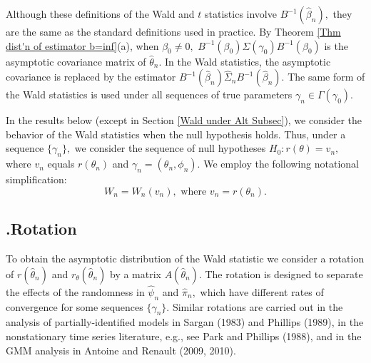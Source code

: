 \documentclass[12pt,thmsb,titlepage,final,oneside,letterpaper]{article}
\begin{document}
\noindent Although these definitions of the Wald and $t$ statistics involve $%
B^{-1}(\widehat{\beta }_{n}),$ they are the same as the standard definitions
used in practice. By Theorem \ref{Thm dist'n of estimator b=inf}(a), when $%
\beta _{0}\neq 0,$ $B^{-1}(\beta _{0})\Sigma (\gamma _{0})B^{-1}(\beta _{0})$
is the asymptotic covariance matrix of $\widehat{\theta }_{n}.$ In the Wald
statistics, the asymptotic covariance is replaced by the estimator $B^{-1}(%
\widehat{\beta }_{n})\widehat{\Sigma }_{n}B^{-1}(\widehat{\beta }_{n}).$ The
same form of the Wald statistics is used under all sequences of true
parameters $\gamma _{n}\in \Gamma (\gamma _{0}).$

In the results below (except in Section \ref{Wald under Alt Subsec}), we
consider the behavior of the Wald statistics when the null hypothesis holds.
Thus, under a sequence $\{\gamma _{n}\},$ we consider the sequence of null
hypotheses $H_{0}:r(\theta )=v_{n},$ where $v_{n}$ equals $r(\theta _{n})$
and $\gamma _{n}=(\theta _{n},\phi _{n}).$ We employ the following
notational simplification:%
\begin{equation}
W_{n}=W_{n}(v_{n}),\text{ where }v_{n}=r(\theta _{n}).
\label{Null Defn of Wald and t Stats}
\end{equation}

\subsection{\hspace{-0.23in}\textbf{.}\hspace{0.18in}Rotation}

\hspace{0.25in}To obtain the asymptotic distribution of the Wald statistic
we consider a rotation of $r(\widehat{\theta }_{n})$ and $r_{\theta }(%
\widehat{\theta }_{n})$ by a matrix $A(\widehat{\theta }_{n}).$ The rotation
is designed to separate the effects of the randomness in $\widehat{\psi }%
_{n} $ and $\widehat{\pi }_{n},$ which have different rates of convergence
for some sequences $\{\gamma _{n}\}.$ Similar rotations are carried out in
the analysis of partially-identified models in Sargan (1983) and Phillips
(1989), in the nonstationary time series literature, e.g., see Park and
Phillips (1988), and in the GMM analysis in Antoine and Renault (2009, 2010).
\end{document}
